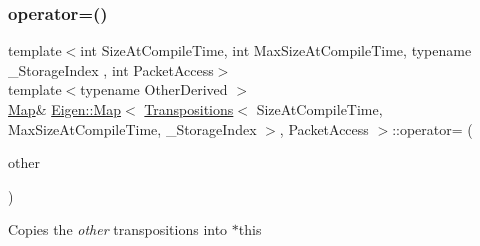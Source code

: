 \subsubsection{\texorpdfstring{operator=()}{operator=()}\hspace{0.1cm}{\footnotesize\ttfamily [1/2]}}
{\footnotesize\ttfamily template$<$int Size\+At\+Compile\+Time, int Max\+Size\+At\+Compile\+Time, typename \+\_\+\+Storage\+Index , int Packet\+Access$>$ \\
template$<$typename Other\+Derived $>$ \\
\mbox{\hyperlink{class_eigen_1_1_map}{Map}}\& \mbox{\hyperlink{class_eigen_1_1_map}{Eigen\+::\+Map}}$<$ \mbox{\hyperlink{class_eigen_1_1_transpositions}{Transpositions}}$<$ Size\+At\+Compile\+Time, Max\+Size\+At\+Compile\+Time, \+\_\+\+Storage\+Index $>$, Packet\+Access $>$\+::operator= (\begin{DoxyParamCaption}\item[{const \mbox{\hyperlink{class_eigen_1_1_transpositions_base}{Transpositions\+Base}}$<$ Other\+Derived $>$ \&}]{other }\end{DoxyParamCaption})\hspace{0.3cm}{\ttfamily [inline]}}

Copies the {\itshape other} transpositions into {\ttfamily $\ast$this} \mbox{\label{class_eigen_1_1_map_3_01_transpositions_3_01_size_at_compile_time_00_01_max_size_at_compile_timecc993082d7c0ba51ca94b27e97da8dd3_aaafbdb07fbd22f5ac9171e6b03d783f4}} 
